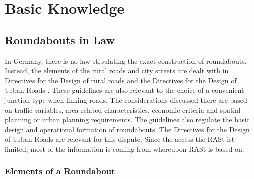 \chapter{Basic Knowledge}


\section{Roundabouts in Law}
%
In Germany, there is no law stipulating the exact construction of roundabouts.
Instead, the elements of the rural roads and city streets are dealt with in Directives for the Design of rural roads \cite{ral13}
and the Directives for the Design of Urban Roads \cite{rast06}. These guidelines are also relevant to the choice of a convenient junction type when linking roads.
The considerations discussed there are based on traffic variables, area-related characteristics, economic criteria and spatial planning or urban planning requirements. 
The guidelines also regulate the basic design and operational formation of roundabouts.
The  Directives for the Design of Urban Roads \cite{rast06} are relevant for this dispute. Since the access the RASt ist limited, most of the information is coming from
\cite{man06} whereupon RASt is based on.
\subsection{Elements of a Roundabout}


